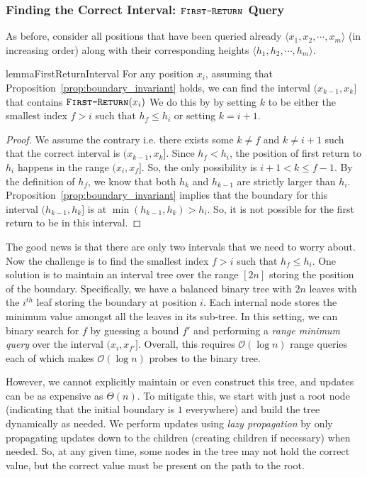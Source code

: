 \subsubsection{Finding the Correct Interval: $\texttt{\textsc{First-Return}}$ Query}
As before, consider all positions that have been queried already $ \langle x_1, x_2,\cdots, x_m \rangle$ (in increasing order)
along with their corresponding heights $ \langle h_1, h_2,\cdots, h_m \rangle$.
\begin{restatable}{lemma}{FirstReturnInterval}
\label{lem:first_return_interval}
For any position $x_i$, assuming that Proposition~\ref{prop:boundary_invariant} holds,
we can find the interval $(x_{k-1},x_{k}]$ that contains $\texttt{\textsc{First-Return}}(x_i)$
We do this by by setting $k$ to be either the smallest index $f>i$ such that $h_f\le h_i$ or setting $k=i+1$.
\end{restatable}
\begin{proof}
We assume the contrary i.e. there exists some $k\not=f$ and $k\not=i+1$ such that the correct interval is $(x_{k-1},x_k]$.
Since $h_f<h_i$, the position of first return to $h_i$ happens in the range $(x_i,x_f]$.
So, the only possibility is $i+1 < k \le f-1$.
By the definition of $h_f$, we know that both $h_k$ and $h_{k-1}$ are strictly larger than $h_i$.
Proposition~\ref{prop:boundary_invariant} implies that the boundary for this interval $(h_{k-1},h_k]$ is at $\min(h_{k-1},h_k) > h_i$.
So, it is not possible for the first return to be in this interval.
\end{proof}

The good news is that there are only two intervals that we need to worry about.
Now the challenge is to find the smallest index $f>i$ such that $h_f\le h_i$.
One solution is to maintain an interval tree  over the range $[2n]$ storing the position of the boundary.
Specifically, we have a balanced binary tree with $2n$ leaves with the $i^{th}$ leaf storing the boundary at position $i$.
Each internal node stores the minimum value amongst all the leaves in its sub-tree.
In this setting, we can binary search for $f$ by guessing a bound $f'$ and performing a \emph{range minimum query} over the interval $(x_i,x_{f'}]$.
Overall, this requires $\mathcal O(\log n)$ range queries each of which makes $\mathcal O(\log n)$ probes to the binary tree.

However, we cannot explicitly maintain or even construct this tree, and updates can be as expensive as $\Theta(n)$.
To mitigate this, we start with just a root node (indicating that the initial boundary is $1$ everywhere) and build the tree dynamically as needed.
We perform updates using \emph{lazy propagation}  by only propagating updates down to the children (creating children if necessary) when needed.
So, at any given time, some nodes in the tree may not hold the correct value, but the correct value must be present on the path to the root.

